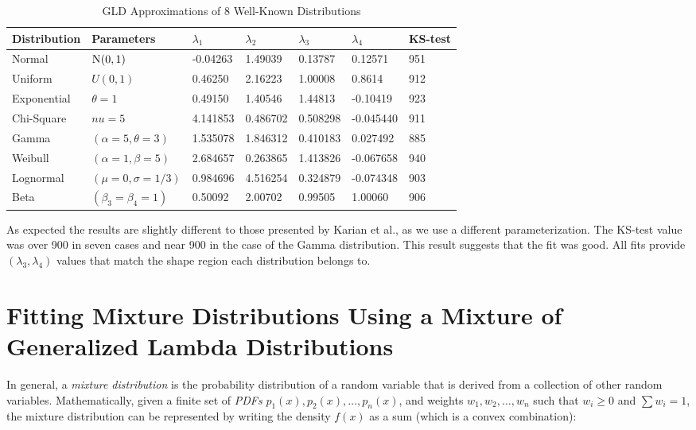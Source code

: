 \begin{table}[H]
\centering
\caption{GLD Approximations of 8 Well-Known Distributions}
\label{tab:gld_fit_other}
\begin{tabular}{l|l|l|l|l|l|l}
\hline
Distribution & Parameters                    & $\lambda_{1}$ & $\lambda_{2}$ & $\lambda_{3}$ & $\lambda_{4}$ & KS-test \\ \hline
Normal       & $\textsc{N}(0, 1)$                     & -0.04263   & 1.49039    & 0.13787    & 0.12571    & 951     \\ \hline
Uniform      & $U(0, 1)$                     & 0.46250     & 2.16223     & 1.00008     & 0.8614     & 912     \\ \hline
Exponential  & $\theta = 1$                  & 0.49150     & 1.40546     & 1.44813     & -0.10419    & 923     \\ \hline
Chi-Square   & $nu = 5$                      & 4.141853    & 0.486702    & 0.508298    & -0.045440   & 911     \\ \hline
Gamma        & $(\alpha = 5, \theta = 3)$    & 1.535078    & 1.846312    & 0.410183    & 0.027492    & 885     \\ \hline
Weibull      & $(\alpha = 1, \beta = 5)$     & 2.684657    & 0.263865    & 1.413826    & -0.067658   & 940     \\ \hline
Lognormal    & $(\mu = 0, \sigma = 1/3)$     & 0.984696    & 4.516254    & 0.324879    & -0.074348   & 903     \\ \hline
Beta         & $(\beta_{3} = \beta_{4} = 1)$ & 0.50092     & 2.00702     & 0.99505     & 1.00060     & 906     \\ \hline
\end{tabular}
\end{table}

As expected the results are slightly different to those presented by Karian et al., as we use a different parameterization. The KS-test value was over 900 in seven cases and near 900 in the case of the Gamma distribution. This result suggests that the fit was good. All fits provide $(\lambda_{3}, \lambda_{4})$ values that match the shape region each distribution belongs to.


\section{Fitting Mixture Distributions Using a Mixture of Generalized Lambda Distributions}\label{sec:gld_mixture}
In general, a \textit{mixture distribution} is the probability distribution of a random variable that is derived from a collection of other random variables. Mathematically, given a finite set of \textit{PDFs} $p_{1}(x),p_{2}(x),\ldots,p_{n}(x)$, and weights $w_{1},w_{2},\ldots,w_{n}$ such that $w_{i} \geq 0$ and $\sum w_{i}=1$, the mixture distribution can be represented by writing the density $f(x)$ as a sum (which is a convex combination):

